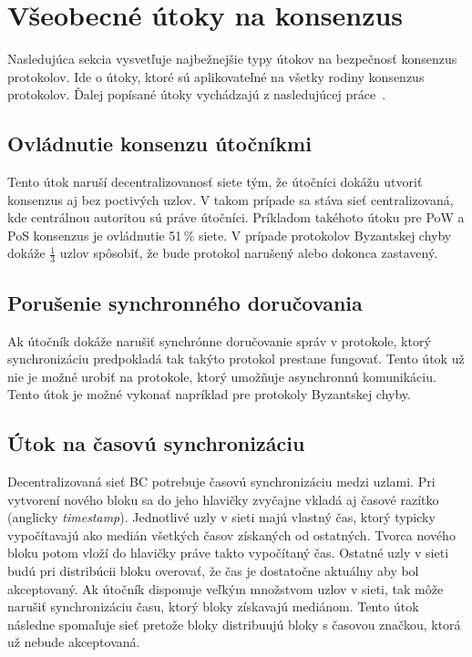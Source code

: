 \section{Všeobecné útoky na konsenzus}
Nasledujúca sekcia vysvetľuje najbežnejšie typy útokov na bezpečnosť konsenzus protokolov. Ide o útoky, ktoré sú aplikovateľné na všetky rodiny konsenzus protokolov. Ďalej popísané útoky vychádzajú z nasledujúcej práce~\cite{homoliakBlockchain}. 

\subsection{Ovládnutie konsenzu útočníkmi}
Tento útok naruší decentralizovanosť siete tým, že útočníci dokážu utvoriť konsenzus aj bez poctivých uzlov. V takom prípade sa stáva sieť centralizovaná, kde centrálnou autoritou sú práve útočníci. Príkladom takéhoto útoku pre PoW a PoS konsenzus je ovládnutie 51\,\% siete. V prípade protokolov Byzantskej chyby dokáže $\frac{1}{3}$ uzlov spôsobiť, že bude protokol narušený alebo dokonca zastavený.

\subsection{Porušenie synchronného doručovania}

Ak útočník dokáže narušiť synchrónne doručovanie správ v protokole, ktorý synchronizáciu predpokladá tak takýto protokol prestane fungovať. Tento útok už nie je možné urobiť na protokole, ktorý umožňuje asynchronnú komunikáciu. Tento útok je možné vykonať napríklad pre protokoly Byzantskej chyby.

\subsection{Útok na časovú synchronizáciu}
Decentralizovaná sieť BC potrebuje časovú synchronizáciu medzi uzlami. Pri vytvorení nového bloku sa do jeho hlavičky zvyčajne vkladá aj časové razítko (anglicky \textit{timestamp}). Jednotlivé uzly v sieti majú vlastný čas, ktorý typicky vypočítavajú ako medián všetkých časov získaných od ostatných. Tvorca nového bloku potom vloží do hlavičky práve takto vypočítaný čas. Ostatné uzly v sieti budú pri distribúcii bloku overovať, že čas je dostatočne aktuálny aby bol akceptovaný. Ak útočník disponuje veľkým množstvom uzlov v sieti, tak môže narušiť synchronizáciu času, ktorý bloky získavajú mediánom. Tento útok následne spomaľuje sieť pretože bloky distribuujú bloky s časovou značkou, ktorá už nebude akceptovaná.

